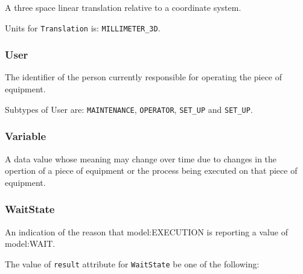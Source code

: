 A three space linear translation relative to a coordinate system.



Units for \texttt{Translation} is: \texttt{MILLIMETER_3D}.

\FloatBarrier

\subsubsection{User}
  \label{sec:User}


The identifier of the person currently responsible for operating the piece of equipment.


Subtypes of User are: \texttt{MAINTENANCE}, \texttt{OPERATOR}, \texttt{SET_UP} and \texttt{SET_UP}. 
\FloatBarrier

\subsubsection{Variable}
  \label{sec:Variable}


A data value whose meaning may change over time due to changes in the opertion of a piece of equipment or the process being executed on that piece of equipment.

\FloatBarrier

\subsubsection{WaitState}
  \label{sec:WaitState}


An indication of the reason that {model:EXECUTION} is reporting a value of {model:WAIT}.


The value of \texttt{result} attribute for \texttt{WaitState} \MUST be one of the following: 


